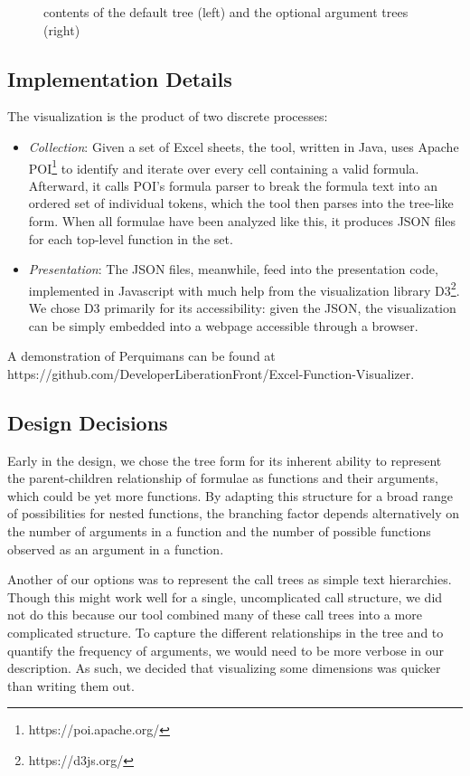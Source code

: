 \documentclass[conference]{IEEEtran}
\newcommand{\toolname}{Perquimans\xspace} \newcommand{\toolnameend}{Perquimans}
\begin{document}
\begin{figure}[h]
{			contents of the default tree (left) and the optional argument trees (right)}
		\label{fig:optional} \end{figure}
	
	
	
	\subsection{Implementation Details} The visualization is the product of two
	discrete processes: \begin{itemize} \item \textit{Collection}: Given a set of
		Excel sheets, the tool, written in Java, uses Apache
		POI\footnote{https://poi.apache.org/} to identify and iterate over every cell
		containing a valid formula. Afterward, it calls POI's formula parser to break
		the formula text into an ordered set of individual tokens, which the tool then
		parses into the tree-like form. When all formulae have been analyzed like this,
		it produces JSON files for each top-level function in the set.
		
		\item \textit{Presentation}: The JSON files, meanwhile, feed into the
		presentation code, implemented in Javascript with much help from the
		visualization library D3\footnote{https://d3js.org/}. We chose D3 primarily
		for its accessibility: given the JSON, the visualization can be simply
		embedded into a webpage accessible through a browser. \end{itemize} A
	demonstration of \toolname can be found at
	https://github.com/DeveloperLiberationFront/Excel-Function-Visualizer.
	
	\subsection{Design Decisions} \label{ssec:decisions} Early in the design, we
	chose the tree form for its inherent ability to represent the parent-children
	relationship of formulae as functions and their arguments, which could be yet
	more functions. By adapting this structure for a broad range of possibilities
	for nested functions, the branching factor depends alternatively on the number
	of arguments in a function and the number of possible functions observed as an
	argument in a function. 
	
	Another of our options was to represent the call trees as simple text
	hierarchies. Though this might work well for a single, uncomplicated call
	structure, we did not do this because our tool combined many of these call
	trees into a more complicated structure. To capture the different relationships
	in the tree and to quantify the frequency of arguments, we would need to be
	more verbose in our description. As such, we decided that visualizing some
	dimensions was quicker than writing them out. 
	
\end{document}
